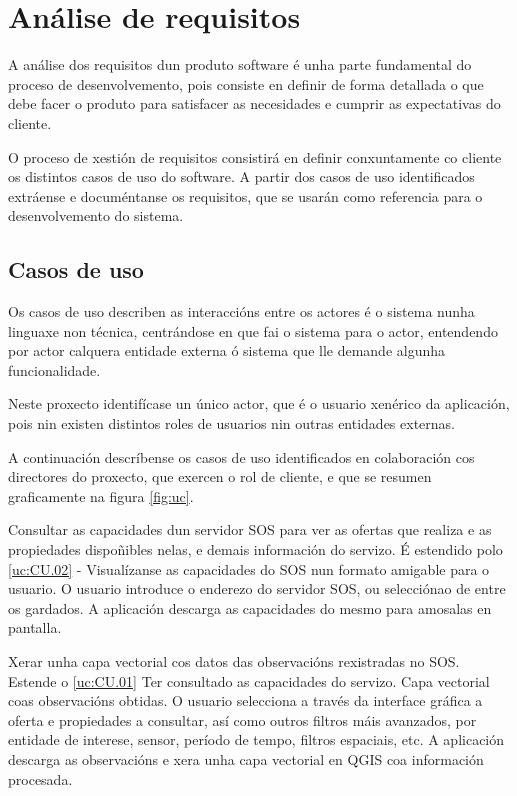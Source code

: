 \chapter{Análise de requisitos}

A análise dos requisitos dun produto software é unha parte fundamental do proceso de desenvolvemento, pois consiste en definir de forma detallada o que debe facer o produto para satisfacer as necesidades e cumprir as expectativas do cliente.

O proceso de xestión de requisitos\cite{GPGR} consistirá en definir conxuntamente co cliente os distintos casos de uso do software. A partir dos casos de uso identificados extráense e documéntanse os requisitos, que se usarán como referencia para o desenvolvemento do sistema.

\section{Casos de uso}

Os casos de uso\cite{UseCase} describen as interaccións entre os actores é o sistema nunha linguaxe non técnica, centrándose en que fai o sistema para o actor, entendendo por actor calquera entidade externa ó sistema que lle demande algunha funcionalidade.

Neste proxecto identifícase un único actor, que é o usuario xenérico da aplicación, pois nin existen distintos roles de usuarios nin outras entidades externas.

A continuación descríbense os casos de uso identificados en colaboración cos directores do proxecto, que exercen o rol de cliente, e que se resumen graficamente na figura \ref{fig:uc}.

			{Consultar as capacidades dun servidor SOS para ver as ofertas que realiza e as propiedades dispoñibles nelas, e demais información do servizo.} %
			{É estendido polo \ref{uc:CU.02}} %
			{-} %
			{Visualízanse as capacidades do SOS nun formato amigable para o usuario.} %
			{O usuario introduce o enderezo do servidor SOS, ou selecciónao de entre os gardados. A aplicación descarga as capacidades do mesmo para amosalas en pantalla. 
			} %
			
			{Xerar unha capa vectorial cos datos das observacións rexistradas no SOS.} %
			{Estende o \ref{uc:CU.01}} %
			{Ter consultado as capacidades do servizo.} %
			{Capa vectorial coas observacións obtidas.} %
			{O usuario selecciona a través da interface gráfica a oferta e propiedades a consultar, así como outros filtros máis avanzados, por entidade de interese, sensor, período de tempo, filtros espaciais, etc. A aplicación descarga as observacións e xera unha capa vectorial en QGIS coa información procesada.
			} %

